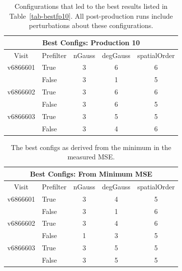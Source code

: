 \documentclass[prd, nofootinbib, floatfix, 11pt,tightenlines,times]{article}
\begin{document}
{\begin{table}
\centering
\begin{tabular}{clccc}
\hline
\multicolumn{5}{|c|}{Best Configs: Production 10} \\
\hline
Visit    & Prefilter & nGauss & degGauss & spatialOrder \\
\hline
v6866601 & True      & 3      & 6        & 6 \\
         & False     & 3      & 1        & 5 \\
v6866602 & True      & 3      & 6        & 6 \\
         & False     & 3      & 6        & 5 \\
v6866603 & True      & 3      & 5        & 5 \\
         & False     & 3      & 4        & 6 \\
\end{tabular}
\caption{Configurations that led to the best results listed in
  Table~\ref{tab-bestfp10}.  All post-production runs include
  perturbations about these configurations. \label{tab-bestconfig10}}
\end{table}

\clearpage

\begin{table}
\centering
\begin{tabular}{clccc}
\hline
\multicolumn{5}{|c|}{Best Configs: From Minimum MSE} \\
\hline
Visit    & Prefilter & nGauss & degGauss & spatialOrder \\
\hline
v6866601 & True      & 3      & 4        & 5 \\
         & False     & 3      & 1        & 6 \\
v6866602 & True      & 3      & 4        & 6 \\
         & False     & 1      & 3        & 5 \\
v6866603 & True      & 3      & 5        & 5 \\
         & False     & 3      & 5        & 5 \\
\end{tabular}
\caption{The best configs as derived from the minimum in the measured MSE.
\label{tab-bestconfig_MSE}}
\end{table}

}
\end{document}
